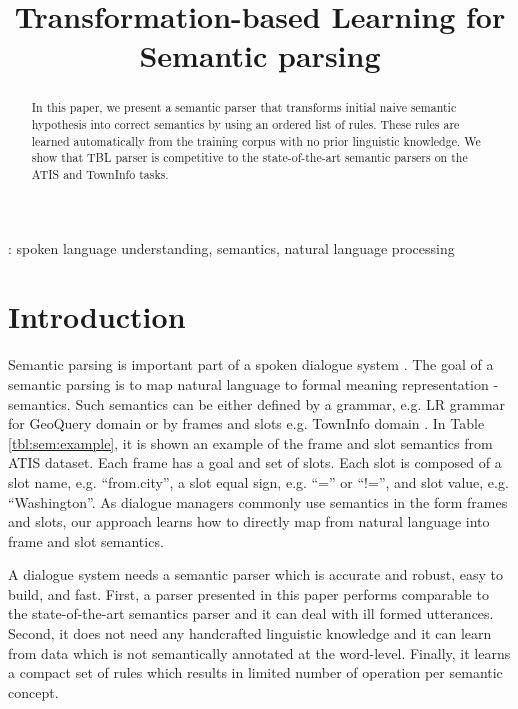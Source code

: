 \documentclass{article}
\title{Transformation-based Learning for Semantic parsing}
\begin{document}
\maketitle
%
\begin{abstract}
In this paper, we present a semantic parser that transforms initial naive semantic hypothesis into correct semantics by using an ordered list of rules. These rules are learned automatically from the training corpus with no prior linguistic knowledge. We show that TBL parser is competitive to the state-of-the-art semantic parsers on the ATIS and TownInfo tasks. 
\end{abstract}
\vspace{0.1cm}
: spoken language understanding, semantics, natural language processing


\section{Introduction}
Semantic parsing is important part of a spoken dialogue system \cite{williams07}. The goal of a semantic parsing is to map natural language to formal meaning representation - semantics. Such semantics can be either defined by a grammar, e.g. LR grammar for GeoQuery domain \cite{kate05} or by frames and slots e.g. TownInfo domain \cite{thomson08}. In Table \ref{tbl:sem:example}, it is shown an example of the frame and slot semantics from ATIS dataset. Each frame has a goal and set of slots. Each slot is composed of a slot name, e.g. ``from.city'', a slot equal sign, e.g. ``='' or ``!='', and slot value, e.g. ``Washington''. As dialogue managers commonly use semantics in the form frames and slots, our approach learns how to directly map from natural language into frame and slot semantics.



A dialogue system needs a semantic parser which is accurate and robust, easy to build, and fast. First, a parser presented in this paper performs comparable to the state-of-the-art semantics parser and it can deal with ill formed utterances. Second, it does not need any handcrafted linguistic knowledge and it can learn from data which is not semantically annotated at the word-level. Finally, it learns a compact set of rules which results in limited number of operation per semantic concept.
\end{document}
